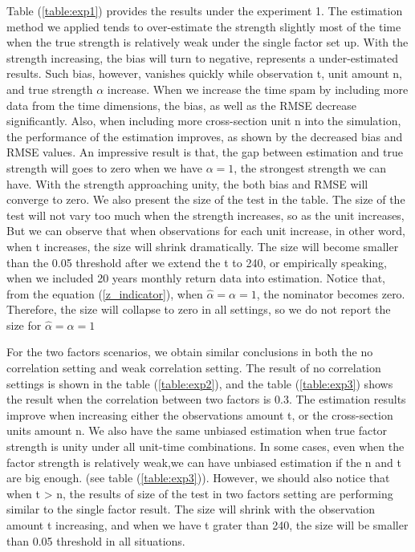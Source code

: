 Table (\ref{table:exp1}) provides the results under the experiment 1.
The estimation method we applied tends to over-estimate the strength slightly most of the time when the true strength is relatively weak under the single factor set up.
With the strength increasing, the bias will turn to negative, represents a under-estimated results.
Such bias, however, vanishes quickly while observation t, unit amount n, and true strength $\alpha$ increase.
When we increase the time spam by including more data from the time dimensions, the bias, as well as the RMSE decrease significantly.
Also, when including more cross-section unit n into the simulation, the performance of the estimation improves, as shown by the decreased bias and RMSE values.
An impressive result is that, the gap between estimation and true strength will goes to zero when we have $\alpha = 1$, the strongest strength we can have.
With the strength approaching unity, the both bias and RMSE will converge to zero.
We also present the size of the test in the table.
The size of the test will not vary too much when the strength increases, so as the unit increases,
But we can observe that when observations for each unit increase, in other word, when t increases, the size will shrink dramatically.
The size will become smaller than the 0.05 threshold after we extend the t to 240, or empirically  speaking, when we included 20 years monthly return data into estimation.
Notice that, from the equation (\ref{z_indicator}), when $\hat{\alpha} = \alpha = 1$, the nominator becomes zero.
Therefore, the size will collapse to zero in all settings, so we do not report the size for $\hat{\alpha} = \alpha = 1$

For the two factors scenarios, we obtain similar conclusions in both the no correlation setting and weak correlation setting.
The result of no correlation settings is shown in the table (\ref{table:exp2}), and the table (\ref{table:exp3}) shows the result when the correlation between two factors is 0.3.
The estimation results improve when increasing either the observations amount t, or the cross-section units amount n.
We also have the same unbiased estimation when true factor strength is unity under all unit-time combinations.
In some cases, even when the factor strength is relatively weak,we can have unbiased estimation if the n and t are big enough. (see table (\ref{table:exp3})).
However, we should also notice that when t > n, the results of size of the test in two factors setting are performing similar to the single factor result. 
The size will shrink with the observation amount t increasing, and when we have t grater than 240, the size will be smaller than 0.05 threshold in all situations.

